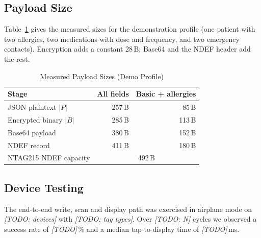 \subsection{Payload Size}

Table~\ref{tab:sizes} gives the measured sizes for the demonstration profile
(one patient with two allergies, two medications with dose and frequency, and
two emergency contacts). Encryption adds a constant 28\,B; Base64 and the
NDEF header add the rest.

\begin{table}[htbp]
\caption{Measured Payload Sizes (Demo Profile)}
\label{tab:sizes}
\centering
\begin{tabular}{@{}lrr@{}}
\toprule
Stage & All fields & Basic + allergies \\
\midrule
JSON plaintext $|P|$          & 257\,B & 85\,B  \\
Encrypted binary $|B|$        & 285\,B & 113\,B \\
Base64 payload                & 380\,B & 152\,B \\
NDEF record                   & 411\,B & 180\,B \\
NTAG215 NDEF capacity         & \multicolumn{2}{c}{492\,B} \\
\bottomrule
\end{tabular}
\end{table}

\subsection{Device Testing}

The end-to-end write, scan and display path was exercised in airplane mode on
\textit{[TODO: devices]} with \textit{[TODO: tag types]}. Over
\textit{[TODO: N]} cycles we observed a success rate of
\textit{[TODO]}\,\% and a median tap-to-display time of \textit{[TODO]}\,ms.


